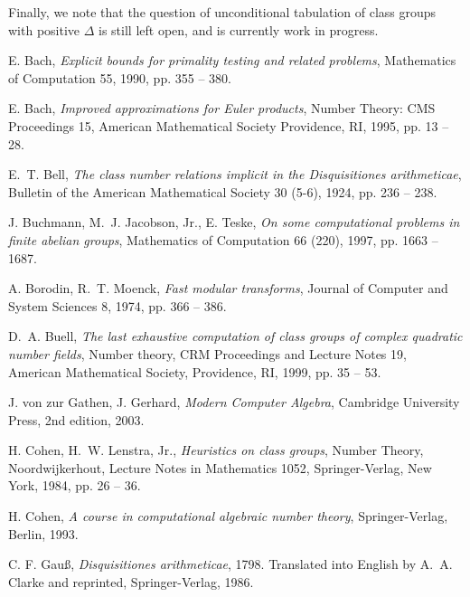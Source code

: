 \documentclass{mcom-l}
\theoremstyle{definition}
\begin{document}
Finally, we note that the question of unconditional tabulation of
class groups with positive $\Delta$ is still left open, and is
currently work in progress.



\providecommand{\bysame}{\leavevmode\hbox to3em{\hrulefill}\thinspace}
\providecommand{\MR}{\relax\ifhmode\unskip\space\fi MR }
\providecommand{\MRhref}[2]{  \href{http://www.ams.org/mathscinet-getitem?mr=#1}{#2}
}
\providecommand{\href}[2]{#2}
\begin{thebibliography}{10}

E. Bach,
\emph{Explicit bounds for primality testing and related problems},
Mathematics of Computation 55, 1990, pp. 355 -- 380.

E. Bach,
\emph{Improved approximations for {E}uler products},
Number Theory: CMS Proceedings 15, American Mathematical Society Providence, RI, 1995, pp. 13 -- 28.

E.~T. Bell,
\emph{The class number relations implicit in the {D}isquisitiones arithmeticae},
Bulletin of the American Mathematical Society 30 (5-6), 1924, pp. 236 -- 238.

J. Buchmann, M.~J. Jacobson, Jr., E. Teske,
\emph{On some computational problems in finite abelian groups},
Mathematics of Computation 66 (220), 1997, pp. 1663 -- 1687.

A. Borodin, R.~T. Moenck,
\emph{Fast modular transforms},
Journal of Computer and System Sciences 8, 1974, pp. 366 -- 386.

D.~A. Buell,
\emph{The last exhaustive computation of class groups of complex quadratic number fields},
Number theory, CRM Proceedings and Lecture Notes 19, American Mathematical Society, Providence, RI, 1999, pp. 35 -- 53.

J. von zur Gathen, J. Gerhard,
\emph{Modern Computer Algebra},
Cambridge University Press, 2nd edition, 2003.

H. Cohen, H.~W. Lenstra, Jr.,
\emph{Heuristics on class groups},
Number Theory, Noordwijkerhout, Lecture Notes in Mathematics 1052, Springer-Verlag, New York, 1984, pp. 26 -- 36.

H. Cohen,
\emph{A course in computational algebraic number theory},
Springer-Verlag, Berlin, 1993.

C. F. Gau\ss,
\emph{Disquisitiones arithmeticae},
1798. Translated into English by A.~A. Clarke and reprinted, Springer-Verlag, 1986.


\end{thebibliography}
\end{document}
